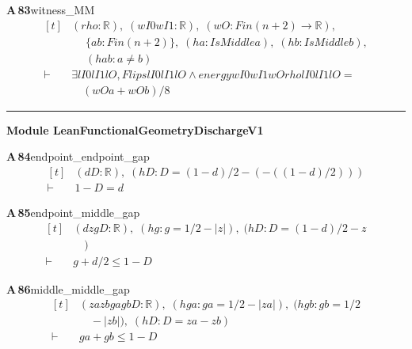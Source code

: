\documentclass[conference]{IEEEtran}
\theoremstyle{definition}
\newcommand{\lean}[1]{\textsf{\footnotesize #1}}
\begin{document}
\noindent\textbf{A\,83}\quad\lean{witness\_MM}
{\footnotesize\[ \begin{aligned}[t]
&(\mathit{rho} : \mathbb{R} ),\; (\mathit{wI0} \mathit{wI1} : \mathbb{R} ),\; (\mathit{wO} : \mathit{Fin} (\mathit{n}+2) \to \mathbb{R} ),\\
&\quad \; \{ \mathit{a} \mathit{b} : \mathit{Fin} (\mathit{n}+2)\},\; (\mathit{ha} : \mathit{IsMiddle} \mathit{a}),\; (\mathit{hb} : \mathit{IsMiddle} \mathit{b}),\\
&\quad \; (\mathit{hab} : \mathit{a} \neq \mathit{b})\\
\vdash\;&\exists \mathit{lI0} \mathit{lI1} \mathit{lO}, \mathit{Flips} \mathit{lI0} \mathit{lI1} \mathit{lO} \wedge \mathit{energy} \mathit{wI0} \mathit{wI1} \mathit{wO} \mathit{rho} \mathit{lI0} \mathit{lI1} \mathit{lO} =\\
&\quad (\mathit{wO} \mathit{a} + \mathit{wO} \mathit{b})/8
\end{aligned} \]}

\vspace{4pt}\noindent\rule{\columnwidth}{0.4pt}\par\vspace{2pt}
\noindent\textbf{Module \lean{LeanFunctionalGeometryDischargeV1}}\par\vspace{3pt}

\noindent\textbf{A\,84}\quad\lean{endpoint\_endpoint\_gap}
{\footnotesize\[ \begin{aligned}[t]
&(\mathit{d} \mathit{D} : \mathbb{R} ),\; (\mathit{hD} : \mathit{D} = (1 - \mathit{d})/2 - (-((1 - \mathit{d})/2)))\\
\vdash\;&1 - \mathit{D} = \mathit{d}
\end{aligned} \]}

\noindent\textbf{A\,85}\quad\lean{endpoint\_middle\_gap}
{\footnotesize\[ \begin{aligned}[t]
&(\mathit{d} \mathit{z} \mathit{g} \mathit{D} : \mathbb{R} ),\; (\mathit{hg} : \mathit{g} = 1/2 - |\mathit{z}|),\; (\mathit{hD} : \mathit{D} = (1 - \mathit{d})/2 - \mathit{z}\\
&\quad )\\
\vdash\;&\mathit{g} + \mathit{d}/2 \leq 1 - \mathit{D}
\end{aligned} \]}

\noindent\textbf{A\,86}\quad\lean{middle\_middle\_gap}
{\footnotesize\[ \begin{aligned}[t]
&(\mathit{za} \mathit{zb} \mathit{ga} \mathit{gb} \mathit{D} : \mathbb{R} ),\; (\mathit{hga} : \mathit{ga} = 1/2 - |\mathit{za}|),\; (\mathit{hgb} : \mathit{gb} = 1/2\\
&\quad - |\mathit{zb}|),\; (\mathit{hD} : \mathit{D} = \mathit{za} - \mathit{zb})\\
\vdash\;&\mathit{ga} + \mathit{gb} \leq 1 - \mathit{D}
\end{aligned} \]}
\end{document}
